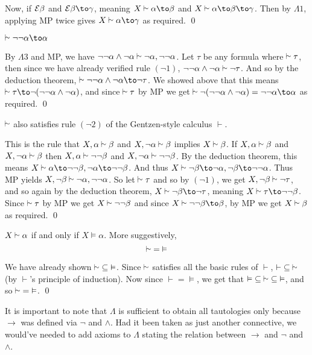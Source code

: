 Now, if ${\cal E}\beta$ and ${\cal E}\beta\to\gamma$, meaning $X\vsim\alpha\to\beta$ and $X\vsim\alpha\to\beta\to\gamma$.
Then by $\Lambda1$, applying MP twice gives $X\vsim\alpha\to\gamma$ as required.
\qed

\blemm

    $\vsim\neg\neg\alpha\to\alpha$

\elemm

By $\Lambda3$ and MP, we have $\neg\neg\alpha\land\neg\alpha\vsim\neg\alpha,\neg\neg\alpha$.
Let $\tau$ be any formula where $\vsim\tau$, then since we have already verified rule $(\neg1)$, $\neg\neg\alpha\land\neg\alpha\vsim\neg\tau$.
And so by the deduction theorem, $\vsim\neg\neg\alpha\land\neg\alpha\to\neg\tau$.
We showed above that this means $\vsim\tau\to\neg(\neg\neg\alpha\land\neg\alpha)$, and since $\vsim\tau$ by MP we get $\vsim\neg(\neg\neg\alpha\land\neg\alpha)=\neg\neg\alpha\to\alpha$ as required.
\qed

\blemm

    $\vsim$ also satisfies rule $(\neg2)$ of the Gentzen-style calculus $\vdash$.

\elemm

This is the rule that $X,\alpha\vsim\beta$ and $X,\neg\alpha\vsim\beta$ implies $X\vsim\beta$.
If $X,\alpha\vsim\beta$ and $X,\neg\alpha\vsim\beta$ then $X,\alpha\vsim\neg\neg\beta$ and $X,\neg\alpha\vsim\neg\neg\beta$.
By the deduction theorem, this means $X\vsim\alpha\to\neg\neg\beta,\neg\alpha\to\neg\neg\beta$.
And thus $X\vsim\neg\beta\to\neg\alpha,\neg\beta\to\neg\neg\alpha$.
Thus MP yields $X,\neg\beta\vsim\neg\alpha,\neg\neg\alpha$.
So let $\vsim\tau$ and so by $(\neg1)$, we get $X,\neg\beta\vsim\neg\tau$, and so again by the deduction theorem, $X\vsim\neg\beta\to\neg\tau$, meaning $X\vsim\tau\to\neg\neg\beta$.
Since $\vsim\tau$ by MP we get $X\vsim\neg\neg\beta$ and since $X\vsim\neg\neg\beta\to\beta$, by MP we get $X\vsim\beta$ as required.
\qed

\bthrm[title=The Completeness Theorem, name=completenessthrm]

    $X\vsim\alpha$ if and only if $X\vDash\alpha$.
    More suggestively,
    $$ {\vsim} = {\vDash} $$

\ethrm

We have already shown ${\vsim}\subseteq{\vDash}$.
Since $\vsim$ satisfies all the basic rules of $\vdash$, ${\vdash}\subseteq{\vsim}$ (by $\vdash$'s principle of induction).
Now since ${\vdash}={\vDash}$, we get that ${\vDash}\subseteq{\vsim}\subseteq{\vDash}$, and so ${\vsim}={\vDash}$.
\qed

It is important to note that $\Lambda$ is sufficient to obtain all tautologies only because $\to$ was defined via $\neg$ and $\land$.
Had it been taken as just another connective, we would've needed to add axioms to $\Lambda$ stating the relation between $\to$ and $\neg$ and $\land$.

